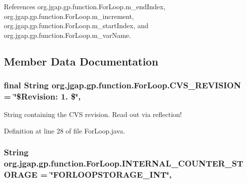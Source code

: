 References org.\-jgap.\-gp.\-function.\-For\-Loop.\-m\-\_\-end\-Index, org.\-jgap.\-gp.\-function.\-For\-Loop.\-m\-\_\-increment, org.\-jgap.\-gp.\-function.\-For\-Loop.\-m\-\_\-start\-Index, and org.\-jgap.\-gp.\-function.\-For\-Loop.\-m\-\_\-var\-Name.



\subsection{Member Data Documentation}
\hypertarget{classorg_1_1jgap_1_1gp_1_1function_1_1_for_loop_af4ebe5ca571a184c6bd5b7b4b452ee22}{
\subsubsection[{C\-V\-S\-\_\-\-R\-E\-V\-I\-S\-I\-O\-N}]{\setlength{\rightskip}{0pt plus 5cm}final String org.\-jgap.\-gp.\-function.\-For\-Loop.\-C\-V\-S\-\_\-\-R\-E\-V\-I\-S\-I\-O\-N = \char`\"{}\$Revision\-: 1. \$\char`\"{}\hspace{0.3cm}{\ttfamily [static]}, {\ttfamily [private]}}}\label{classorg_1_1jgap_1_1gp_1_1function_1_1_for_loop_af4ebe5ca571a184c6bd5b7b4b452ee22}
String containing the C\-V\-S revision. Read out via reflection! 

Definition at line 28 of file For\-Loop.\-java.

\hypertarget{classorg_1_1jgap_1_1gp_1_1function_1_1_for_loop_a8a1e154d26ba0413277f2c85ccc858ed}{
\subsubsection[{I\-N\-T\-E\-R\-N\-A\-L\-\_\-\-C\-O\-U\-N\-T\-E\-R\-\_\-\-S\-T\-O\-R\-A\-G\-E}]{\setlength{\rightskip}{0pt plus 5cm}String org.\-jgap.\-gp.\-function.\-For\-Loop.\-I\-N\-T\-E\-R\-N\-A\-L\-\_\-\-C\-O\-U\-N\-T\-E\-R\-\_\-\-S\-T\-O\-R\-A\-G\-E = \char`\"{}F\-O\-R\-L\-O\-O\-P\-S\-T\-O\-R\-A\-G\-E\-\_\-\-I\-N\-T\char`\"{}\hspace{0.3cm}{\ttfamily [static]}, {\ttfamily [private]}}}\label{classorg_1_1jgap_1_1gp_1_1function_1_1_for_loop_a8a1e154d26ba0413277f2c85ccc858ed}


